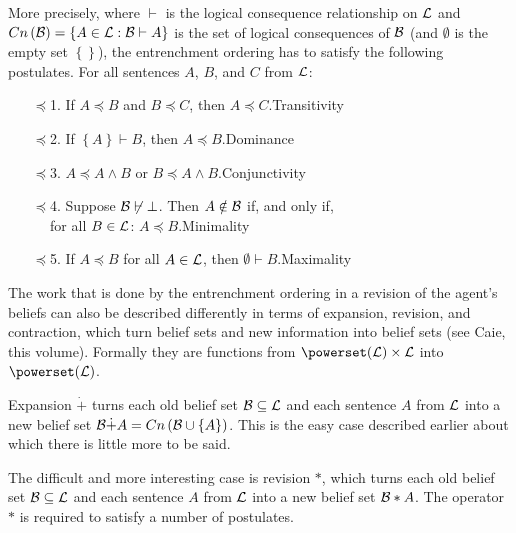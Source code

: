 More precisely, where $\vdash$ is the logical consequence relationship on $\cal L$ and $Cn\left(\cal B\right)=\left\{A\in\begin{cal}L\end{cal}:\begin{cal}B\end{cal}\vdash A\right\}$ is the set of logical consequences of $\cal B$ (and $\emptyset$ is the empty set $\left\{\right\}$), the entrenchment ordering has to satisfy the following postulates. For all sentences $A$, $B$, and $C$ from $\cal L$:
\begin{enumerate}
\item[$\preceq$1.] If $A\preceq B$ and $B\preceq C$, then $A\preceq C$.\hfill Transitivity
\item[$\preceq$2.] If $\left\{A\right\}\vdash B$, then $A\preceq B$.\hfill Dominance
\item[$\preceq$3.] $A\preceq A\wedge B$ or $B\preceq A\wedge B$.\hfill Conjunctivity
\item[$\preceq$4.] Suppose $\begin{cal}B\end{cal}\not\vdash\bot$. Then $A\notin\cal B$ if, and only if,\\$\phantom{M}$\hspace{1em} for all $B\in\cal L$: $A\preceq B$.\hfill Minimality
\item[$\preceq$5.] If $A\preceq B$ for all $A\in\cal L$, then $\emptyset\vdash B$.\hfill Maximality
\end{enumerate}

The work that is done by the entrenchment ordering in a revision of the agent's beliefs can also be described differently in terms of expansion, revision, and contraction, which turn belief sets and new information into belief sets (see Caie, this volume). Formally they are functions from $\powerset\!\left(\cal L\right)\times\cal L$ into $\powerset\!\left(\cal L\right)$.

Expansion $\dot+$ turns each old belief set $\cal B\subseteq L$ and each sentence $A$ from $\cal L$ into a new belief set $\begin{cal}B\end{cal}\dot+A=Cn\left(\begin{cal}B\end{cal}\cup\left\{A\right\}\right)$. This is the easy case described earlier about which there is little more to be said.

The difficult and more interesting case is revision $*$, which turns each old belief set $\cal B\subseteq L$ and each sentence $A$ from $\cal L$ into a new belief set $\begin{cal}B\end{cal}*A$. The operator $*$ is required to satisfy a number of postulates.

